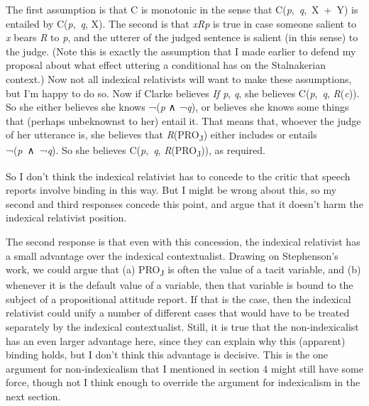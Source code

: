 \documentclass[
  11pt,
  letterpaper,
  DIV=11,
  numbers=noendperiod,
  twoside]{scrartcl}
\begin{document}
The first assumption is that C is monotonic in the sense that
C(\emph{p},~\emph{q},~X~+~Y) is entailed by C(\emph{p},~\emph{q}, X).
The second is that \emph{xRp} is true in case someone salient to
\emph{x} bears \emph{R} to \emph{p}, and the utterer of the judged
sentence is salient (in this sense) to the judge. (Note this is exactly
the assumption that I made earlier to defend my proposal about what
effect uttering a conditional has on the Stalnakerian context.) Now not
all indexical relativists will want to make these assumptions, but I'm
happy to do so. Now if Clarke believes \emph{If p}, \emph{q}, she
believes C(\emph{p},~\emph{q}, \emph{R}(\emph{c})). So she either
believes she knows ¬(\emph{p} ∧ ¬\emph{q}), or believes she knows some
things that (perhaps unbeknownst to her) entail it. That means that,
whoever the judge of her utterance is, she believes that
\emph{R}(PRO\textsubscript{J}) either includes or entails
¬(\emph{p}~∧~¬\emph{q}). So she believes C(\emph{p},~\emph{q},
\emph{R}(PRO\textsubscript{J})), as required.

So I don't think the indexical relativist has to concede to the critic
that speech reports involve binding in this way. But I might be wrong
about this, so my second and third responses concede this point, and
argue that it doesn't harm the indexical relativist position.

The second response is that even with this concession, the indexical
relativist has a small advantage over the indexical contextualist.
Drawing on Stephenson's work, we could argue that (a)
PRO\textsubscript{J} is often the value of a tacit variable, and (b)
whenever it is the default value of a variable, then that variable is
bound to the subject of a propositional attitude report. If that is the
case, then the indexical relativist could unify a number of different
cases that would have to be treated separately by the indexical
contextualist. Still, it is true that the non-indexicalist has an even
larger advantage here, since they can explain why this (apparent)
binding holds, but I don't think this advantage is decisive. This is the
one argument for non-indexicalism that I mentioned in section 4 might
still have some force, though not I think enough to override the
argument for indexicalism in the next section.
\end{document}
